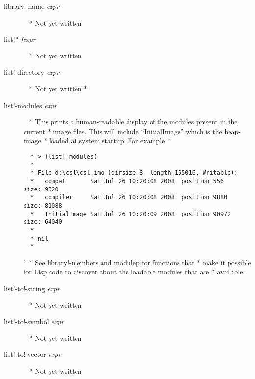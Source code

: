 \documentclass[a4paper,11pt]{article}
\begin{document}
\begin{description}
\item [{\ttfamily library!-name} {\itshape  expr}]  ~\newline
  * Not yet written

\item [{\ttfamily list!*} {\itshape  fexpr}]  ~\newline
  * Not yet written

\item [{\ttfamily list!-directory} {\itshape  expr}]  ~\newline
  * Not yet written
  *

\item [{\ttfamily list!-modules} {\itshape  expr}]  ~\newline
  * This prints a human-readable display of the modules present in the current
  * image files. This will include ``InitialImage'' which is the heap-image
  * loaded at system startup. For example
  * {\footnotesize \begin{verbatim}
  * > (list!-modules)
  *
  * File d:\csl\csl.img (dirsize 8  length 155016, Writable):
  *   compat       Sat Jul 26 10:20:08 2008  position 556   size: 9320
  *   compiler     Sat Jul 26 10:20:08 2008  position 9880  size: 81088
  *   InitialImage Sat Jul 26 10:20:09 2008  position 90972 size: 64040
  *
  * nil
  * \end{verbatim}}
  *
  * See {\ttfamily library!-members} and {\ttfamily modulep} for functions that
  * make it possible for Lisp code to discover about the loadable modules that are
  * available.

\item [{\ttfamily list!-to!-string} {\itshape  expr}]  ~\newline
  * Not yet written

\item [{\ttfamily list!-to!-symbol} {\itshape  expr}]  ~\newline
  * Not yet written

\item [{\ttfamily list!-to!-vector} {\itshape  expr}]  ~\newline
  * Not yet written


\end{description}
\end{document}
